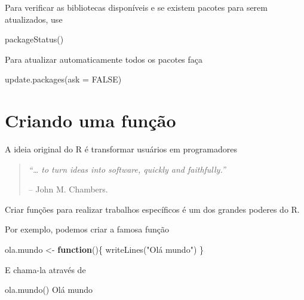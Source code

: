 \documentclass[
  10pt,
  a4paper]{book}
\newenvironment{Shaded}{\begin{snugshade}}{\end{snugshade}}
\newcommand{\AttributeTok}[1]{\textcolor[rgb]{0.77,0.63,0.00}{#1}}
\newcommand{\ConstantTok}[1]{\textcolor[rgb]{0.00,0.00,0.00}{#1}}
\newcommand{\ControlFlowTok}[1]{\textcolor[rgb]{0.13,0.29,0.53}{\textbf{#1}}}
\newcommand{\FunctionTok}[1]{\textcolor[rgb]{0.00,0.00,0.00}{#1}}
\newcommand{\NormalTok}[1]{#1}
\newcommand{\OtherTok}[1]{\textcolor[rgb]{0.56,0.35,0.01}{#1}}
\newcommand{\StringTok}[1]{\textcolor[rgb]{0.31,0.60,0.02}{#1}}
\begin{document}
Para verificar as bibliotecas disponíveis e se existem pacotes para serem
atualizados, use

\begin{Shaded}
\begin{Highlighting}[]
\FunctionTok{packageStatus}\NormalTok{()}
\end{Highlighting}
\end{Shaded}

Para atualizar automaticamente todos os pacotes faça

\begin{Shaded}
\begin{Highlighting}[]
\FunctionTok{update.packages}\NormalTok{(}\AttributeTok{ask =} \ConstantTok{FALSE}\NormalTok{)}
\end{Highlighting}
\end{Shaded}

\hypertarget{criando-uma-funuxe7uxe3o}{%
\section{Criando uma função}\label{criando-uma-funuxe7uxe3o}}

A ideia original do R é transformar usuários em programadores

\begin{quote}
\emph{``\ldots{} to turn ideas into software, quickly and faithfully.''}

-- John M. Chambers.
\end{quote}

Criar funções para realizar trabalhos específicos é um dos grandes
poderes do R.

Por exemplo, podemos criar a famosa função

\begin{Shaded}
\begin{Highlighting}[]
\NormalTok{ola.mundo }\OtherTok{\textless{}{-}} \ControlFlowTok{function}\NormalTok{()\{}
    \FunctionTok{writeLines}\NormalTok{(}\StringTok{"Olá mundo"}\NormalTok{)}
\NormalTok{\}}
\end{Highlighting}
\end{Shaded}

E chama-la através de

\begin{Shaded}
\begin{Highlighting}[]
\FunctionTok{ola.mundo}\NormalTok{()}
\NormalTok{Olá mundo}
\end{Highlighting}
\end{Shaded}
\end{document}
